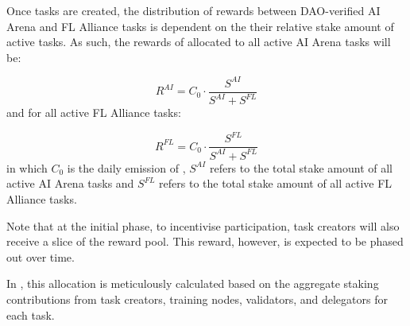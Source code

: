 \documentclass[conference]{IEEEtran}
\begin{document}



Once tasks are created, the distribution of rewards between DAO-verified AI Arena and FL Alliance tasks is dependent on the their relative stake amount of active tasks. As such, the rewards of \FML allocated to all active AI Arena tasks will be:

$$R^{AI} = C_0 \cdot \frac{S^{AI}}{S^{AI} + S^{FL}}$$
and for all active FL Alliance tasks:

$$R^{FL} = C_0 \cdot \frac{S^{FL}}{S^{AI} + S^{FL}}$$
in which $C_0$ is the daily emission of \FML, $S^{AI}$ refers to the total stake amount of all active AI Arena tasks and $S^{FL}$ refers to the total stake amount of all active FL Alliance tasks. 

Note that at the initial phase, to incentivise participation, task creators will also receive a slice of the reward pool. This reward, however, is expected to be phased out over time. 

In \SNT, this allocation is meticulously calculated based on the aggregate staking contributions from task creators, training nodes, validators, and delegators for each task. 

\end{document}

